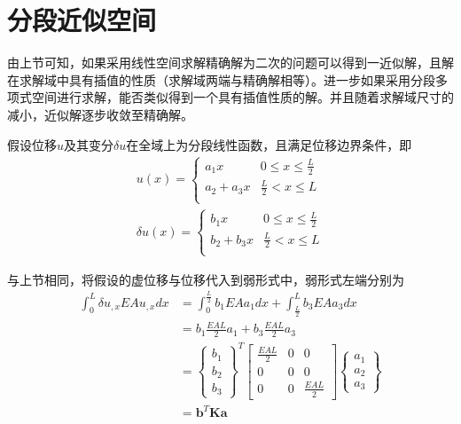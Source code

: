 \section{分段近似空间}
由上节可知，如果采用线性空间求解精确解为二次的问题可以得到一近似解，且解在求解域中具有插值的性质（求解域两端与精确解相等）。进一步如果采用分段多项式空间进行求解，能否类似得到一个具有插值性质的解。并且随着求解域尺寸的减小，近似解逐步收敛至精确解。\par
假设位移$u$及其变分$\delta u$在全域上为分段线性函数，且满足位移边界条件，即
\begin{subequations}\label{ch_energy:disph}
\begin{align}
u(x) =
\begin{cases}
    a_1 x & 0 \le x \le \frac{L}{2} \\
    a_2 + a_3 x & \frac{L}{2} < x \le L \\
\end{cases} \\
\delta u(x) =
\begin{cases}
    b_1 x & 0 \le x \le \frac{L}{2} \\
    b_2 + b_3 x & \frac{L}{2} < x \le L \\
\end{cases}
\end{align}
\end{subequations}\par
与上节相同，将假设的虚位移与位移代入到弱形式中，弱形式左端分别为
\begin{equation}\label{ch_energy:eq1}
\begin{split}
    \int_0^L \delta u_{,x}EA u_{,x} dx &= \int_0^{\frac{L}{2}} b_1 EA a_1 dx + \int_{\frac{L}{2}}^L b_3 EA a_3 dx \\
                                       &= b_1 \frac{EAL}{2} a_1 + b_3 \frac{EAL}{2} a_3 \\
                                       &= \begin{Bmatrix}
                                       b_1 \\ b_2 \\ b_3 
                                       \end{Bmatrix}^T
                                       \begin{bmatrix}
                                       \frac{EAL}{2} & 0 & 0 \\
                                       0 & 0 & 0 \\
                                       0 & 0 & \frac{EAL}{2}
                                       \end{bmatrix}
                                       \begin{Bmatrix}
                                       a_1 \\ a_2 \\ a_3 
                                       \end{Bmatrix} \\
                                       &= \boldsymbol b^T \boldsymbol K \boldsymbol a
\end{split}
\end{equation}
